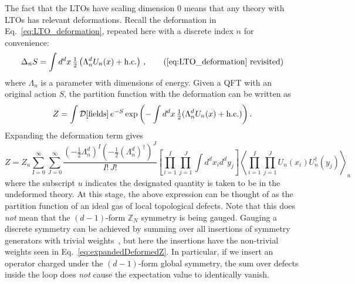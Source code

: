 \documentclass[11pt]{article}
\def\ZZ{\mathbb{Z}}
\def\coeff#1#2{{\textstyle {\frac {#1}{#2}}}}
\def\half{\coeff 12}
\begin{document}
The fact that the LTOs have scaling dimension $0$ means that any theory with
LTOs has relevant deformations.   Recall the deformation in
Eq.~\eqref{eq:LTO_deformation}, repeated here with a discrete index $n$ for
convenience:
\begin{equation}
    \Delta_n S=\int d^{d}x \, \half  \left(\Lambda_n^d U_n(x)+\text{h.c.}\right)\,,
    \tag{\ref{eq:LTO_deformation} revisited}
\end{equation}
where $\Lambda_n$ is a parameter with dimensions of energy.  
Given a QFT with an original
action $S$, the partition function with the deformation can be written as
\begin{align}
    Z
    =\int \mathcal{D}[{\rm fields}] \, e^{-S} \exp{\left(-\int d^dx \, \half (\Lambda^d_n U_n(x) + \textrm{h.c.} )\right)}\,.
\end{align}
Expanding the deformation term gives 
\begin{equation}
    Z
    = Z_u
    \sum_{I=0}^\infty\sum_{J=0}^\infty\frac{(-\half \Lambda^d_n)^{I}(-\half (\Lambda^d_n)^{\dag})^{J}}{I! \, J!} \left[\prod_{i=1}^I\prod_{j=1}^J\int d^{d} x_{i} d^{d} y_{j} \right]
     \left\langle \prod_{i=1}^I\prod_{j=1}^J U_n(x_i) U_n^\dagger(y_j)\right\rangle_u
    \label{eq:expandedDeformedZ}
\end{equation}
where the subscript $u$ indicates the designated quantity is taken to be in the
undeformed theory. At this stage, the above expression can be thought of as the
partition function of an ideal gas of local topological defects. Note
that this does \emph{not} mean that the $(d-1)$-form $\ZZ_N$ symmetry is being gauged.
Gauging a discrete symmetry can be achieved by summing over all insertions of
symmetry generators with trivial weights~\cite{Gaiotto:2014kfa}, but here the insertions have the
non-trivial weights seen in Eq.~\eqref{eq:expandedDeformedZ}. In particular,  if we insert an operator charged under the $(d-1)$-form global symmetry, the sum over defects inside the loop does \emph{not} cause the expectation value to identically vanish. 
\end{document}
